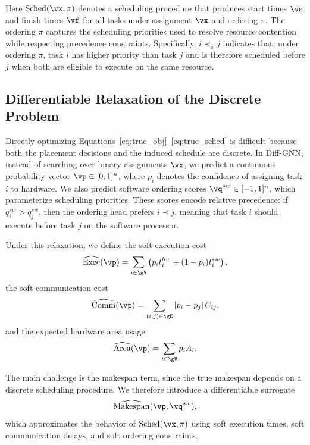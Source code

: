 Here $\mathrm{Sched}(\vx, \pi)$ denotes a scheduling procedure that produces start times $\vs$ and finish times $\vf$ for all tasks under assignment $\vx$ and ordering $\pi$. The ordering $\pi$ captures the scheduling priorities used to resolve resource contention while respecting precedence constraints. Specifically, $i \prec_\pi j$ indicates that, under ordering $\pi$, task $i$ has higher priority than task $j$ and is therefore scheduled before $j$ when both are eligible to execute on the same resource.

\subsection{Differentiable Relaxation of the Discrete Problem}

Directly optimizing Equations~\eqref{eq:true_obj}--\eqref{eq:true_sched} is difficult because both the placement decisions and the induced schedule are discrete. In Diff-GNN, instead of searching over binary assignments $\vx$, we predict a continuous probability vector $\vp \in [0,1]^n$, where $p_i$ denotes the confidence of assigning task $i$ to hardware. We also predict software ordering scores $\vq^{sw}\in[-1,1]^n$, which parameterize scheduling priorities. These scores encode relative precedence: if $q_i^{sw} > q_j^{sw}$, then the ordering head prefers $i \prec j$, meaning that task $i$ should execute before task $j$ on the software processor.

Under this relaxation, we define the soft execution cost
\begin{equation}
\widehat{\mathrm{Exec}}(\vp)=
\sum_{i\in\gV}
\left(
p_i t_i^{hw} + (1-p_i)t_i^{sw}
\right),
\label{eq:soft_exec}
\end{equation}
the soft communication cost
\begin{equation}
\widehat{\mathrm{Comm}}(\vp)=
\sum_{(i,j)\in\gE}
|p_i-p_j|\, C_{ij},
\label{eq:soft_comm}
\end{equation}
and the expected hardware area usage
\begin{equation}
\widehat{\mathrm{Area}}(\vp)=\sum_{i\in\gV} p_i A_i.
\label{eq:soft_area}
\end{equation}

The main challenge is the makespan term, since the true makespan depends on a discrete scheduling procedure. We therefore introduce a differentiable surrogate
\begin{equation}
\widehat{\mathrm{Makespan}}(\vp,\vq^{sw}),
\label{eq:soft_makespan_symbol}
\end{equation}
which approximates the behavior of $\mathrm{Sched}(\vx,\pi)$ using soft execution times, soft communication delays, and soft ordering constraints.

